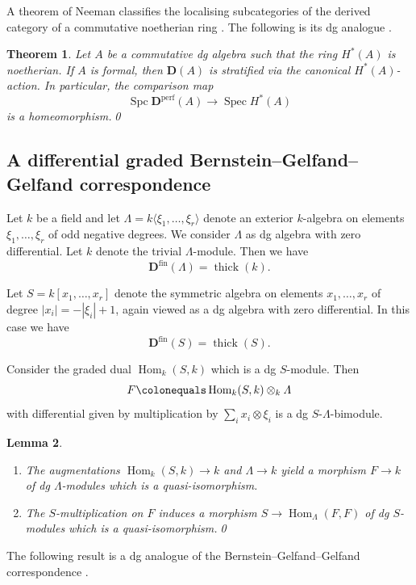 \documentclass{amsart}[a4]
\newtheorem{theorem}{Theorem}[section]
\newtheorem{lemma}[theorem]{Lemma}
\theoremstyle{definition}
\theoremstyle{remark}
\numberwithin{equation}{section}
\newcommand{\Hom}{\operatorname{Hom}}
\newcommand{\Spc}{\operatorname{Spc}}
\newcommand{\Spec}{\operatorname{Spec}}
\newcommand{\thick}{\operatorname{thick}}
\newcommand{\lto}{\longrightarrow}
\newcommand{\fin}{\mathrm{fin}}
\newcommand{\perf}{\mathrm{perf}}
\newcommand{\bfD}{\mathbf D}
\let\Lambda\varLambda
\begin{document}
A theorem of Neeman classifies the localising subcategories
of the derived category of a commutative noetherian ring
\cite{Neeman:1992a}. The following  is its dg analogue
\cite[Theorem~8.1]{Benson/Iyengar/Krause:2011a}.

\begin{theorem}\label{th:Neeman-dga}
Let $A$ be a commutative dg algebra such that the ring $H^*(A)$ is noetherian.
If $A$ is formal, then $\bfD(A)$ is stratified via the canonical
$H^*(A)$-action. In particular, the comparison map
\[\Spc \bfD^\perf(A)\lto\Spec H^*(A)\] is a homeomorphism.\qed
\end{theorem}


\subsection*{A differential graded Bernstein--Gelfand--Gelfand correspondence}

Let $k$ be a field and let $\Lambda=k\langle\xi_1,\ldots,\xi_r\rangle$
denote an exterior $k$-algebra on 
elements $\xi_1,\ldots,\xi_r$ of odd negative degrees. We
consider $\Lambda$ as dg algebra with zero differential. Let $k$
denote the trivial $\Lambda$-module. Then we have
\[\bfD^\fin(\Lambda)=\thick(k).\]

Let $S=k[x_1,\ldots,x_r]$ denote the symmetric algebra on elements
$x_1,\ldots,x_r$ of degree
$|x_i|=-|\xi_i|+1$, again viewed as a dg algebra with zero
diﬀerential. In this case we have
\[\bfD^\fin(S)=\thick(S).\]

Consider the graded dual $\Hom_k(S,k)$ which is a dg $S$-module. Then
\[F\colonequals\Hom_k(S,k)\otimes_k\Lambda\] with differential given by
multiplication by $\sum_i x_i\otimes\xi_i$ is a  dg $S$-$\Lambda$-bimodule.

\begin{lemma}
  \begin{enumerate}
    \item The augmentations $\Hom_k(S,k)\to k$ and $\Lambda\to k$
      yield a morphism $F\to k$ of dg $\Lambda$-modules which is a quasi-isomorphism.
    \item The $S$-multiplication on $F$ induces a morphism
      $S\to \Hom_\Lambda(F,F)$ of dg $S$-modules which is a
      quasi-isomorphism.\qed
      \end{enumerate}
    \end{lemma}

The following result is a dg analogue of the Bernstein--Gelfand--Gelfand
correspondence \cite{Avramov/Buchweitz/Iyengar/Miller:2010a}.
\end{document}
